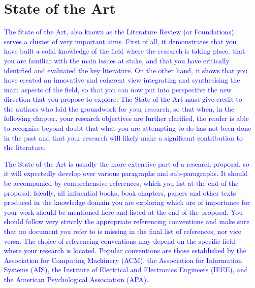 \chapter{State of the Art}
\label{ch:stateart}


\textcolor{blue}{
The State of the Art, also known as the Literature Review (or Foundations), serves a 
cluster of very important aims. First of all, it demonstrates that you have built a solid 
knowledge of the field where the research is taking place, that you are familiar with the 
main issues at stake, and that you have critically identified and evaluated the key 
literature. On the other hand, it shows that you have created an innovative and coherent 
view integrating and synthesising the main aspects of the field, so that you can now put 
into perspective the new direction that you propose to explore. The State of the Art must 
give credit to the authors who laid the groundwork for your research, so that when, in 
the following chapter, your research objectives are further clarified, the reader is able to 
recognise beyond doubt that what you are attempting to do has not been done in the past 
and that your research will likely make a significant contribution to the literature.
}

\textcolor{blue}{
The State of the Art is usually the more extensive part of a research proposal, so it will 
expectedly develop over various paragraphs and sub-paragraphs. It should be 
accompanied by comprehensive references, which you list at the end of the proposal. 
Ideally, all influential books, book chapters, papers and other texts produced in the knowledge domain you are exploring which are of importance for your work should be 
mentioned here and listed at the end of the proposal. You should follow very strictly the 
appropriate referencing conventions and make sure that no document you refer to is 
missing in the final list of references, nor vice versa. The choice of referencing 
conventions may depend on the specific field where your research is located. Popular 
conventions are those established by the Association for Computing Machinery (ACM), 
the Association for Information Systems (AIS), the Institute of Electrical and 
Electronics Engineers (IEEE), and the American Psychological Association (APA).}
